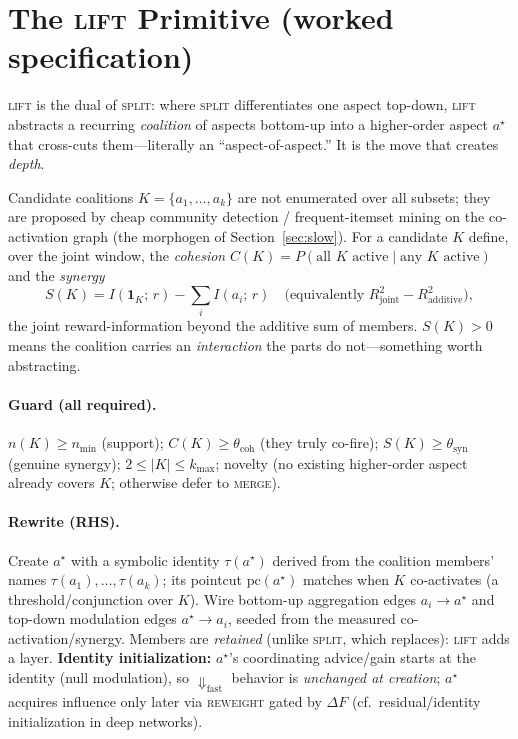 \documentclass[11pt]{article}
\theoremstyle{definition}
\begin{document}
\section{The \textsc{lift} Primitive (worked specification)}
\label{sec:lift}

\textsc{lift} is the dual of \textsc{split}: where \textsc{split} differentiates
one aspect top-down, \textsc{lift} abstracts a recurring \emph{coalition} of
aspects bottom-up into a higher-order aspect $a^\star$ that cross-cuts
them---literally an ``aspect-of-aspect.'' It is the move that creates
\emph{depth}.

Candidate coalitions $K=\{a_1,\dots,a_k\}$ are not enumerated over all subsets;
they are proposed by cheap community detection / frequent-itemset mining on the
co-activation graph (the morphogen of Section~\ref{sec:slow}). For a candidate
$K$ define, over the joint window, the \emph{cohesion}
$C(K)=P(\text{all }K\text{ active}\mid\text{any }K\text{ active})$ and the
\emph{synergy}
\begin{equation}
S(K)=I(\mathbf{1}_K;\,r)-\sum_{i} I(a_i;\,r)
\quad\bigl(\text{equivalently } R^2_\text{joint}-R^2_\text{additive}\bigr),
\end{equation}
the joint reward-information beyond the additive sum of members. $S(K)>0$ means
the coalition carries an \emph{interaction} the parts do not---something worth
abstracting.

\paragraph{Guard (all required).}
$n(K)\ge n_\text{min}$ (support); \quad $C(K)\ge\theta_\text{coh}$ (they truly
co-fire); \quad $S(K)\ge\theta_\text{syn}$ (genuine synergy); \quad
$2\le|K|\le k_\text{max}$; \quad novelty (no existing higher-order aspect
already covers $K$; otherwise defer to \textsc{merge}).

\paragraph{Rewrite (RHS).}
Create $a^\star$ with a symbolic identity $\tau(a^\star)$ derived from the
coalition members' names $\tau(a_1),\dots,\tau(a_k)$; its pointcut
$\mathrm{pc}(a^\star)$ matches when $K$ co-activates (a threshold/conjunction
over $K$). Wire bottom-up aggregation edges $a_i\!\to\!a^\star$ and top-down
modulation edges $a^\star\!\to\!a_i$, seeded from the measured
co-activation/synergy. Members are \emph{retained} (unlike \textsc{split}, which
replaces): \textsc{lift} adds a layer. \textbf{Identity initialization:}
$a^\star$'s coordinating advice/gain starts at the identity (null modulation),
so $\Downarrow_\text{fast}$ behavior is \emph{unchanged at creation}; $a^\star$
acquires influence only later via \textsc{reweight} gated by $\Delta F$
(cf.\ residual/identity initialization in deep networks).
\end{document}
